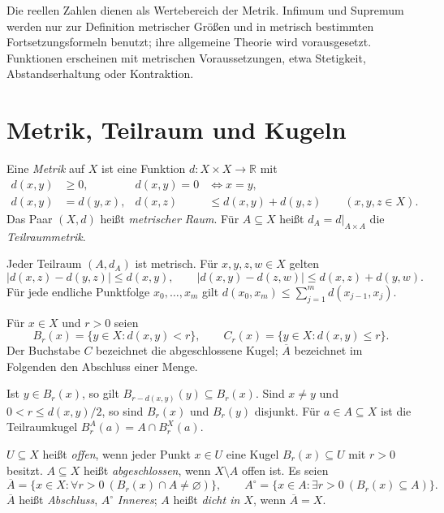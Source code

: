 Die reellen Zahlen dienen als Wertebereich der Metrik. Infimum und Supremum
werden nur zur Definition metrischer Größen und in metrisch bestimmten
Fortsetzungsformeln benutzt; ihre allgemeine
Theorie wird vorausgesetzt. Funktionen erscheinen mit metrischen
Voraussetzungen, etwa Stetigkeit, Abstandserhaltung oder Kontraktion.

\section{Metrik, Teilraum und Kugeln}

\begin{definition}
\label{b47guide:def:metric}
Eine \emph{Metrik} auf $X$ ist eine Funktion $d:X\times X\to\mathbb R$ mit
\[
\begin{aligned}
 d(x,y)&\geq0,&d(x,y)=0&\iff x=y,\\
 d(x,y)&=d(y,x),&d(x,z)&\leq d(x,y)+d(y,z)
 \qquad(x,y,z\in X).
\end{aligned}
\]
Das Paar $(X,d)$ heißt \emph{metrischer Raum}. Für $A\subseteq X$ heißt
$d_A=d|_{A\times A}$ die \emph{Teilraummetrik}.
\end{definition}

\begin{theorem}
Jeder Teilraum $(A,d_A)$ ist metrisch. Für $x,y,z,w\in X$ gelten
\[
 |d(x,z)-d(y,z)|\leq d(x,y),\qquad
 |d(x,y)-d(z,w)|\leq d(x,z)+d(y,w).
\]
Für jede endliche Punktfolge $x_0,\ldots,x_m$ gilt
$d(x_0,x_m)\leq\sum_{j=1}^{m}d(x_{j-1},x_j)$.
\end{theorem}

\begin{definition}
Für $x\in X$ und $r>0$ seien
\[
 B_r(x)=\{y\in X:d(x,y)<r\},\qquad
 C_r(x)=\{y\in X:d(x,y)\leq r\}.
\]
Der Buchstabe $C$ bezeichnet die abgeschlossene Kugel; $\overline A$
bezeichnet im Folgenden den Abschluss einer Menge.
\end{definition}

\begin{theorem}
Ist $y\in B_r(x)$, so gilt
$B_{r-d(x,y)}(y)\subseteq B_r(x)$.
Sind $x\ne y$ und $0<r\leq d(x,y)/2$, so sind $B_r(x)$ und $B_r(y)$
disjunkt. Für $a\in A\subseteq X$ ist die Teilraumkugel
$B_r^{A}(a)=A\cap B_r^{X}(a)$.
\end{theorem}

\begin{definition}
\label{b47guide:def:closure}
$U\subseteq X$ heißt \emph{offen}, wenn jeder Punkt $x\in U$ eine Kugel
$B_r(x)\subseteq U$ mit $r>0$ besitzt. $A\subseteq X$ heißt
\emph{abgeschlossen}, wenn $X\setminus A$ offen ist. Es seien
\[
 \overline A=\{x\in X:\forall r>0\ (B_r(x)\cap A\ne\varnothing)\},
 \qquad
 A^\circ=\{x\in A:\exists r>0\ (B_r(x)\subseteq A)\}.
\]
$\overline A$ heißt \emph{Abschluss}, $A^\circ$ \emph{Inneres}; $A$ heißt
\emph{dicht in $X$}, wenn $\overline A=X$.
\end{definition}

